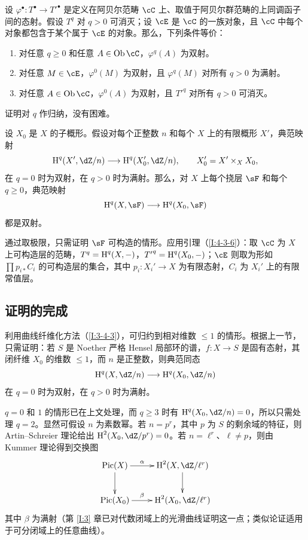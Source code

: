 \begin{lemma}\label{I:4-3-6}
设 $\varphi^\bullet:T^\bullet\to{T'}^\bullet$ 是定义在阿贝尔范畴 $\cC$ 上、取值于阿贝尔群范畴的上同调函子间的态射。假设 $T^q$ 对 $q>0$ 可消灭；设 $\cE$ 是 $\cC$ 的一族对象，且 $\cC$ 中每个对象都包含于某个属于 $\cE$ 的对象。那么，下列条件等价：
\begin{enumerate}[\indent (i)]
\item 对任意 $q\geqslant0$ 和任意 $A\in\ob\cC$，$\varphi^q(A)$ 为双射。
\item 对任意 $M\in\cE$，$\varphi^0(M)$ 为双射，且 $\varphi^q(M)$ 对所有 $q>0$ 为满射。
\item 对任意 $A\in\ob\cC$，$\varphi^0(A)$ 为双射，且 ${T'}^q$ 对所有 $q>0$ 可消灭。
\end{enumerate}
\end{lemma}
证明对 $q$ 作归纳，没有困难。
\begin{proposition}\label{I:4-3-7}
设 $X_0$ 是 $X$ 的子概形。假设对每个正整数 $n$ 和每个 $X$ 上的有限概形 $X'$，典范映射
\[
\h^q(X',\dZ/n)\longrightarrow\h^q(X'_0,\dZ/n),\qquad X'_0=X'\times_XX_0,
\]
在 $q=0$ 时为双射，在 $q>0$ 时为满射。那么，对 $X$ 上每个挠层 $\sF$ 和每个 $q\geqslant0$，典范映射
\[
\h^q(X,\sF)\longrightarrow\h^q(X_0,\sF)
\]
都是双射。
\end{proposition}
通过取极限，只需证明 $\sF$ 可构造的情形。应用引理（\ref{I:4-3-6}）：取 $\cC$ 为 $X$ 上可构造层的范畴，$T^q=\operatorname{H}^q(X,-)$，${T'}^q=\operatorname{H}^q(X_0,-)$；$\cE$ 则取为形如 $\prod p_{i*}C_i$ 的可构造层的集合，其中 $p_i:X_i'\to X$ 为有限态射，$C_i$ 为 $X_i'$ 上的有限常值层。

\subsection{证明的完成}\label{I:4-4}
利用曲线纤维化方法（\ref{I:3-4-3}），可归约到相对维数 $\leqslant1$ 的情形。根据上一节，只需证明：若 $S$ 是 Noether 严格 Hensel 局部环的谱，$f:X\to S$ 是固有态射，其闭纤维 $X_0$ 的维数 $\leqslant1$，而 $n$ 是正整数，则典范同态
\[
\h^q(X,\dZ/n)\longrightarrow\h^q(X_0,\dZ/n)
\]
在 $q=0$ 时为双射，在 $q>0$ 时为满射。

$q=0$ 和 $1$ 的情形已在上文处理，而 $q\geqslant3$ 时有 $\h^q(X_0,\dZ/n)=0$，所以只需处理 $q=2$。显然可假设 $n$ 为素数幂。若 $n=p^r$，其中 $p$ 为 $S$ 的剩余域的特征，则 Artin--Schreier 理论给出 $\h^2(X_0,\dZ/p^r)=0$。若 $n=\ell^r$、$\ell\ne p$，则由 Kummer 理论得到交换图
\[\xymatrix{
\pic(X)\ar[d]\ar[r]^-\alpha&\h^2(X,\dZ/\ell^r)\ar[d]\\
\pic(X_0)\ar[r]^-\beta&\h^2(X_0,\dZ/\ell^r)
}\]
其中 $\beta$ 为满射（第 \ref{I:3} 章已对代数闭域上的光滑曲线证明这一点；类似论证适用于可分闭域上的任意曲线）。

